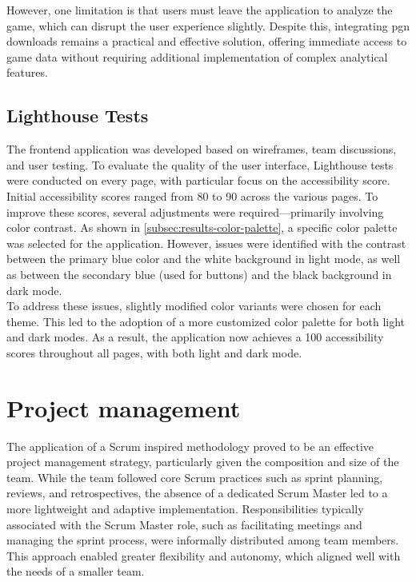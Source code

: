 However, one limitation is that users must leave the application to analyze the game, which can disrupt the user experience slightly. Despite this, integrating \gls{pgn} downloads remains a practical and effective solution, offering immediate access to game data without requiring additional implementation of complex analytical features.

\subsection{Lighthouse Tests}
The frontend application was developed based on wireframes, team discussions, and user testing. To evaluate the quality of the user interface, Lighthouse tests were conducted on every page, with particular focus on the accessibility score. \\

Initial accessibility scores ranged from 80 to 90 across the various pages. To improve these scores, several adjustments were required—primarily involving color contrast. As shown in \ref{subsec:results-color-palette}, a specific color palette was selected for the application. However, issues were identified with the contrast between the primary blue color and the white background in light mode, as well as between the secondary blue (used for buttons) and the black background in dark mode. \\

To address these issues, slightly modified color variants were chosen for each theme. This led to the adoption of a more customized color palette for both light and dark modes. As a result, the application now achieves a 100 accessibility scores throughout all pages, with both light and dark mode. 

\section{Project management}
\label{sec:discussion-project-management}

The application of a Scrum inspired methodology proved to be an effective project management strategy, particularly given the composition and size of the team. While the team followed core Scrum practices such as sprint planning, reviews, and retrospectives, the absence of a dedicated Scrum Master led to a more lightweight and adaptive implementation. Responsibilities typically associated with the Scrum Master role, such as facilitating meetings and managing the sprint process, were informally distributed among team members. This approach enabled greater flexibility and autonomy, which aligned well with the needs of a smaller team. \\


